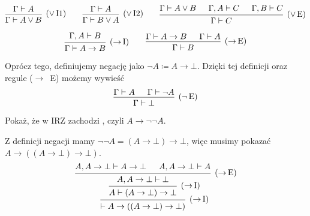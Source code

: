 \documentclass[polish,pretty]{angav}
\begin{document}
\[
\begin{prooftree}
    \hypo{\Gamma\vdash A}
    \infer1[($\lor\!$ I1)]{\Gamma\vdash A \lor B}
\end{prooftree}
\qquad
\begin{prooftree}
    \hypo{\Gamma\vdash A}
    \infer1[($\lor\!$ I2)]{\Gamma\vdash B \lor A}
\end{prooftree}
\qquad
\begin{prooftree}
    \hypo{\Gamma\vdash A \lor B}
    \hypo{\Gamma,A\vdash C}
    \hypo{\Gamma,B\vdash C}
    \infer3[($\lor\!$ E)]{\Gamma\vdash C}
\end{prooftree}
\]

\[
\begin{prooftree}
    \hypo{\Gamma,A\vdash B}
    \infer1[($\to\!$ I)]{\Gamma\vdash A \to B}
\end{prooftree}
\qquad
\begin{prooftree}
    \hypo{\Gamma\vdash A \to B}
    \hypo{\Gamma\vdash A}
    \infer2[($\to\!$ E)]{\Gamma\vdash B}
\end{prooftree}
\]

Oprócz tego, definiujemy negację jako $\neg A \coloneqq A \to \bot$. Dzięki tej definicji oraz regule ($\to\!$~E) możemy wywieść
\[
\begin{prooftree}
    \hypo{\Gamma\vdash A}
    \hypo{\Gamma\vdash \neg A}
    \infer2[($\neg\!$ E)]{\Gamma\vdash \bot}
\end{prooftree}
\]

\begin{example}
    Pokaż, że w IRZ zachodzi , czyli $A \to \neg\neg A$.
\end{example}
\begin{solution}
    Z definicji negacji mamy $\neg\neg A = (A \to \bot) \to \bot$, więc musimy pokazać $A \to ((A\to\bot) \to \bot)$.
    \[
    \begin{prooftree}
        \hypo{A, A\to\bot \vdash A\to\bot}
        \hypo{A, A\to\bot \vdash A}
        \infer2[($\to\!$ E)]{A, A\to\bot \vdash \bot}
        \infer1[($\to\!$ I)]{A \vdash (A\to\bot) \to \bot}
        \infer1[($\to\!$ I)]{\vdash A \to ((A\to\bot) \to \bot)}
    \end{prooftree}
    \]
\end{solution}
\end{document}
